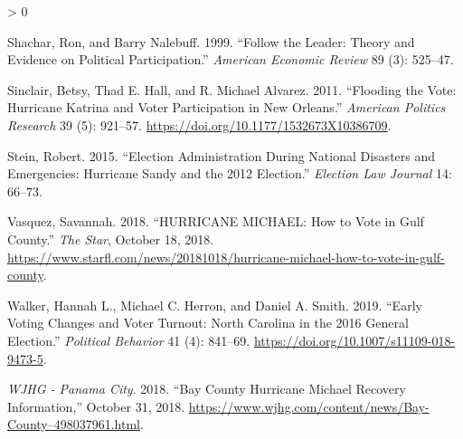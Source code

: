 \documentclass[
  12pt,
]{article}
\newlength{\cslhangindent}
\newenvironment{CSLReferences}[2] %
 {%
  \setlength{\parindent}{0pt}
  \ifodd #1 \everypar{\setlength{\hangindent}{\cslhangindent}}\ignorespaces\fi
  \ifnum #2 > 0
  \setlength{\parskip}{#2\baselineskip}
  \fi
 }%
 {}
\begin{document}
\begin{CSLReferences}{1}{0}
\leavevmode\hypertarget{ref-Shachar1999}{}%
Shachar, Ron, and Barry Nalebuff. 1999. {``Follow the {Leader}: {Theory} and {Evidence} on {Political Participation}.''} \emph{American Economic Review} 89 (3): 525--47.

\leavevmode\hypertarget{ref-Sinclair2011}{}%
Sinclair, Betsy, Thad E. Hall, and R. Michael Alvarez. 2011. {``Flooding the {Vote}: {Hurricane Katrina} and {Voter Participation} in {New Orleans}.''} \emph{American Politics Research} 39 (5): 921--57. \url{https://doi.org/10.1177/1532673X10386709}.

\leavevmode\hypertarget{ref-Stein2015}{}%
Stein, Robert. 2015. {``Election {Administration During National Disasters} and {Emergencies}: {Hurricane Sandy} and the 2012 {Election}.''} \emph{Election Law Journal} 14: 66--73.

\leavevmode\hypertarget{ref-Vasquez2018}{}%
Vasquez, Savannah. 2018. {``{HURRICANE MICHAEL}: {How} to Vote in {Gulf County}.''} \emph{The Star}, October 18, 2018. \url{https://www.starfl.com/news/20181018/hurricane-michael-how-to-vote-in-gulf-county}.

\leavevmode\hypertarget{ref-Walker2019}{}%
Walker, Hannah L., Michael C. Herron, and Daniel A. Smith. 2019. {``Early {Voting Changes} and {Voter Turnout}: {North Carolina} in the 2016 {General Election}.''} \emph{Political Behavior} 41 (4): 841--69. \url{https://doi.org/10.1007/s11109-018-9473-5}.

\leavevmode\hypertarget{ref-WJHG2018}{}%
\emph{WJHG - Panama City}. 2018. {``Bay {County Hurricane Michael Recovery Information},''} October 31, 2018. \url{https://www.wjhg.com/content/news/Bay-County–498037961.html}.

\end{CSLReferences}
\end{document}
